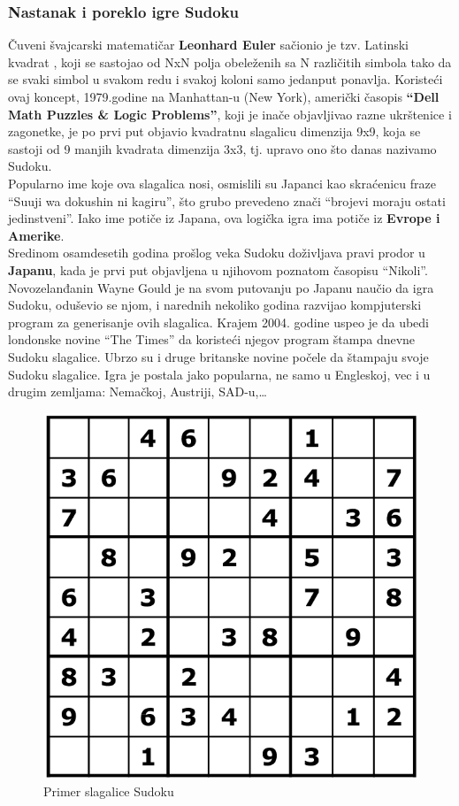 \documentclass[a4paper]{article}
\begin{document}
\subsubsection{Nastanak i poreklo igre Sudoku}
Čuveni švajcarski matematičar \textbf{Leonhard Euler} sačionio je tzv. Latinski kvadrat , koji se sastojao od NxN polja obeleženih sa N različitih simbola tako da se svaki simbol u svakom redu i svakoj koloni samo jedanput ponavlja. Koristeći ovaj koncept, 1979.godine na Manhattan-u (New York), američki časopis \textbf{“Dell Math Puzzles \& Logic Problems”}, koji je inače objavljivao razne ukrštenice i zagonetke, je po prvi put objavio kvadratnu slagalicu dimenzija 9x9, koja se sastoji od 9 manjih kvadrata dimenzija 3x3, tj. upravo ono što danas nazivamo Sudoku. \\
Popularno ime koje ova slagalica nosi, osmislili su Japanci kao skraćenicu fraze “Suuji wa dokushin ni kagiru”, što grubo prevedeno znači “brojevi moraju ostati jedinstveni”. Iako ime potiče iz Japana, ova logička igra ima potiče iz \textbf{Evrope i Amerike}.\\
Sredinom osamdesetih godina prošlog veka Sudoku doživljava pravi prodor u \textbf{Japanu}, kada je prvi put objavljena u njihovom poznatom časopisu “Nikoli”. Novozelanđanin Wayne Gould je na svom putovanju po Japanu naučio da igra Sudoku, oduševio se njom, i narednih nekoliko godina razvijao kompjuterski program za generisanje ovih slagalica. Krajem 2004. godine uspeo je da ubedi londonske novine “The Times” da koristeći njegov program štampa dnevne Sudoku slagalice. Ubrzo su i druge britanske novine počele da štampaju svoje Sudoku slagalice. Igra je postala jako popularna, ne samo u Engleskoj, vec i u drugim zemljama: Nemačkoj, Austriji, SAD-u,…
\begin{figure}[h]
    \centering
    \includegraphics[scale=0.26]{primer_sudoku_neresen.png}
    \caption{Primer slagalice Sudoku}
    \label{fig:sudokuEmpty}
\end{figure}
\end{document}
